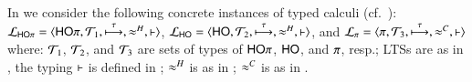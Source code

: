 \smallskip

In  %
we consider the following concrete instances of typed calculi (cf.~): \\
%
	$\mathcal{L}_{\mathsf{HO}\pi}=\langle \mathsf{HO}\pi, {\cal{T}}_1, \stackrel{\tau}{\longmapsto}, \approx^H, \vdash \rangle$,
	$\mathcal{L}_{\mathsf{HO}}=\langle \mathsf{HO}, {\cal{T}}_2, \stackrel{\tau}{\longmapsto}, \approx^H, \vdash \rangle$, and
	$\mathcal{L}_{\pi}=\langle \pi, {\cal{T}}_3, \stackrel{\tau}{\longmapsto}, \approx^C, \vdash \rangle$ 
%
where: 
${\cal{T}}_1$, ${\cal{T}}_2$, 
and ${\cal{T}}_3$
are sets of types of $\mathsf{HO}\pi$, $\mathsf{HO}$, and $\pi$, resp.;
LTSs are as in , 
the typing $\vdash$ is defined in 
;  
$\approx^H$ is as in ; 
$\approx^C$ is as in .


